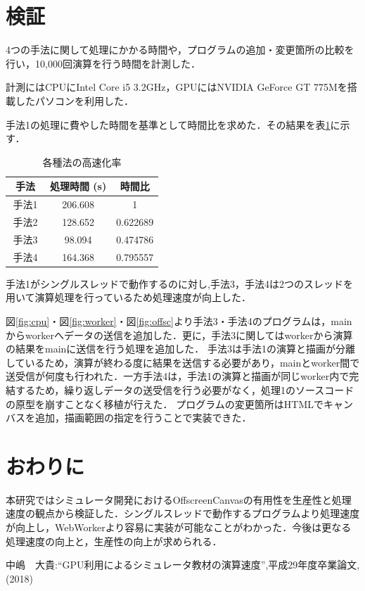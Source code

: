 \documentclass[twocolumn,10pt,a4j]{jsarticle}
\begin{document}
\section{検証}
4つの手法に関して処理にかかる時間や，プログラムの追加・変更箇所の比較を行い，10,000回演算を行う時間を計測した．

計測にはCPUにIntel Core i5 3.2GHz，GPUにはNVIDIA GeForce GT 775Mを搭載したパソコンを利用した．

手法1の処理に費やした時間を基準として時間比を求めた．その結果を表\ref{tab:tab2}に示す．

\begin{table} [htbp]
\centering
\vspace{-30pt}
\caption{各種法の高速化率}
\vspace{5pt}
	\begin{tabular} {| c | c | c | } \hline
	手法　& 処理時間  (s)  & 時間比 \\ \hline
	手法1 & 206.608 & 1 \\ \hline 
	手法2 & 128.652 & 0.622689 \\ \hline
	手法3 & 98.094 & 0.474786 \\ \hline
	手法4 & 164.368 & 0.795557 \\ \hline
	\end{tabular} 
	\label{tab:tab2}
\end{table}
手法1がシングルスレッドで動作するのに対し,手法3，手法4は2つのスレッドを用いて演算処理を行っているため処理速度が向上した．

図\ref{fig:cpu}・図\ref{fig:worker}・図\ref{fig:offsc}より手法3・手法4のプログラムは，mainからworkerへデータの送信を追加した．更に，手法3に関してはworkerから演算の結果をmainに送信を行う処理を追加した．
手法3は手法1の演算と描画が分離しているため，演算が終わる度に結果を送信する必要があり，mainとworker間で送受信が何度も行われた．一方手法4は，手法1の演算と描画が同じworker内で完結するため，繰り返しデータの送受信を行う必要がなく，処理1のソースコードの原型を崩すことなく移植が行えた．
プログラムの変更箇所はHTMLでキャンバスを追加，描画範囲の指定を行うことで実装できた．
\section{おわりに}
本研究ではシミュレータ開発におけるOffscreenCanvasの有用性を生産性と処理速度の観点から検証した．シングルスレッドで動作するプログラムより処理速度が向上し，WebWorkerより容易に実装が可能なことがわかった．今後は更なる処理速度の向上と，生産性の向上が求められる．
\begin{thebibliography}{99}

	中嶋　大貴:``GPU利用によるシミュレータ教材の演算速度'',平成29年度卒業論文,(2018)
\end{thebibliography}
\end{document}
